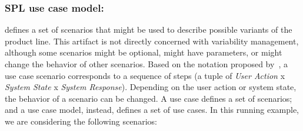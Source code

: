 \documentclass{llncs}
\begin{document}
\subsubsection{SPL use case model:} 

defines a set of scenarios that might be used to describe possible variants of the product line. This artifact is not directly concerned 
with variability management, although some scenarios might be optional, might have parameters, or might change the behavior of other 
scenarios. Based on the notation proposed by~\cite{gcabral-sbmf-2006},  a use case scenario corresponds to a sequence of
steps (a tuple of \emph{User Action} x \emph{System State} x \emph{System Response}). Depending on the user action or system state, 
the behavior of a scenario can be changed. A use case defines a set of scenarios; and a use case model, instead, defines a set of use cases.
In this running example, we are considering the following scenarios:
\end{document}
